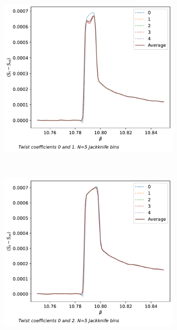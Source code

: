 \documentclass[english,twoside,openright]{UH_TCM_MSc}
\begin{document}
\begin{figure}[htpb]
    \begin{subfigure}[t]{0.5\textwidth}
        \centering
        \includegraphics[width=\textwidth]{final_plots/44_44_64/action_diff_0-1.pdf}
    \end{subfigure}%
    ~ 
    \begin{subfigure}[t]{0.5\textwidth}
        \centering
        \includegraphics[width=\textwidth]{final_plots/44_44_64/action_diff_0-2.pdf}
    \end{subfigure}

\end{figure}
\end{document}
